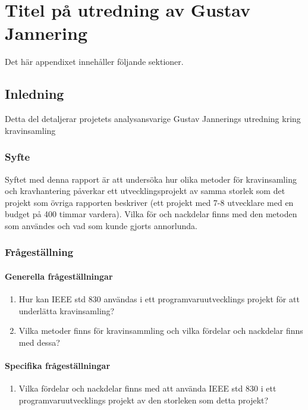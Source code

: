 \chapter{Titel på utredning av Gustav Jannering}
\label{cha:indiv-report-person}

Det här appendixet innehåller följande sektioner.

\section{Inledning}
\label{sec:introduction-person}

Detta del detaljerar projetets analysansvarige Gustav Jannerings utredning kring kravinsamling

\subsection{Syfte}
\label{sec:purpose-person}

Syftet med denna rapport är att undersöka hur olika metoder för kravinsamling och kravhantering påverkar ett utvecklingsprojekt av samma storlek som det projekt som övriga rapporten beskriver (ett projekt med 7-8 utvecklare med en budget på 400 timmar vardera). Vilka för och nackdelar finns med den metoden som användes och vad som kunde gjorts annorlunda.
\subsection{Frågeställning}
\label{sec:issue-person}

\subsubsection{Generella frågeställningar}
\begin{enumerate}
	\item Hur kan IEEE std 830 användas i ett programvaruutvecklings projekt för att underlätta kravinsamling?
	\item Vilka metoder finns för kravinsammling och vilka fördelar och nackdelar finns med dessa? 
\end{enumerate}
\subsubsection{Specifika frågeställningar}
\begin{enumerate}
	\item Vilka fördelar och nackdelar finns med att använda IEEE std 830 i ett programvaruutvecklings projekt av den storleken som detta projekt?
\end{enumerate}
